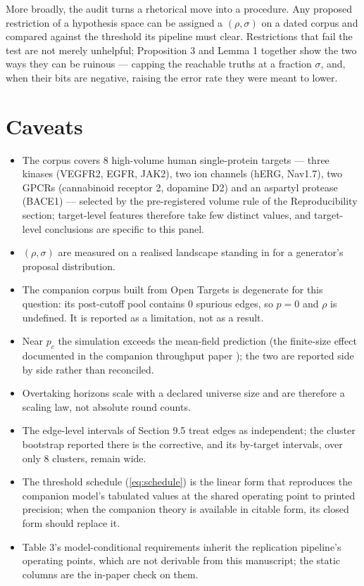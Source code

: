 \documentclass[11pt]{article}
\begin{document}
More broadly, the audit turns a rhetorical move into a procedure. Any
proposed restriction of a hypothesis space can be assigned a $(\rho,
\sigma)$ on a dated corpus and compared against the threshold its pipeline
must clear. Restrictions that fail the test are not merely unhelpful;
Proposition 3 and Lemma 1 together show the two ways they can be ruinous
--- capping the reachable truths at a fraction $\sigma$, and, when their
bits are negative, raising the error rate they were meant to lower.

\section{Caveats}

\begin{itemize}
\item The corpus covers 8 high-volume human single-protein targets ---
three kinases (VEGFR2, EGFR, JAK2), two ion channels (hERG, Nav1.7),
two GPCRs (cannabinoid receptor 2, dopamine D2) and an aspartyl
protease (BACE1) --- selected by the pre-registered volume rule of the
Reproducibility section; target-level features therefore take few
distinct values, and target-level conclusions are specific to this
panel.
\item $(\rho, \sigma)$ are measured on a realised landscape standing in for
a generator's proposal distribution.
\item The companion corpus built from Open Targets is degenerate for this
question: its post-cutoff pool contains 0 spurious edges, so $p = 0$ and
$\rho$ is undefined. It is reported as a limitation, not as a result.
\item Near $p_c$ the simulation exceeds the mean-field prediction (the
finite-size effect documented in the companion throughput paper
\cite{ghosh-throughput}); the two are reported side by side rather than
reconciled.
\item Overtaking horizons scale with a declared universe size and are
therefore a scaling law, not absolute round counts.
\item The edge-level intervals of Section 9.5 treat edges as
independent; the cluster bootstrap reported there is the corrective,
and its by-target intervals, over only 8 clusters, remain wide.
\item The threshold schedule (\ref{eq:schedule}) is the linear form that
reproduces the companion model's tabulated values at the shared operating
point to printed precision; when the companion theory is available in
citable form, its closed form should replace it.
\item Table 3's model-conditional requirements inherit the replication
pipeline's operating points, which are not derivable from this manuscript;
the static columns are the in-paper check on them.
\end{itemize}
\end{document}
